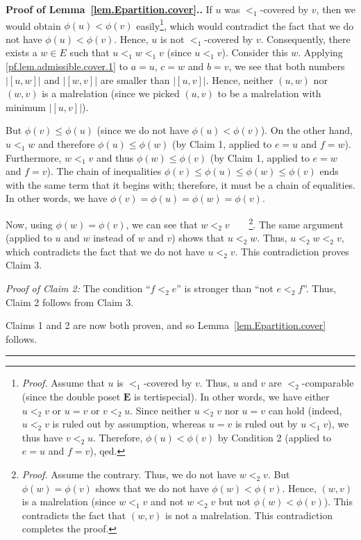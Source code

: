 \documentclass[numbers=enddot,12pt,final,onecolumn,notitlepage,abstracton]{scrartcl}
\theoremstyle{definition}
\newenvironment{proof}[1][Proof]{\noindent\textbf{#1.} }{\ \rule{0.5em}{0.5em}}
\newcommand{\EE}{{\mathbf{E}}}
\begin{document}
\begin{proof}[Proof of Lemma~\ref{lem.Epartition.cover}.]
If $u$ was $<_1$-covered by $v$, then we would obtain
$\phi\left(u\right) < \phi\left(v\right)$
easily\footnote{\textit{Proof.} Assume that $u$ is
$<_1$-covered by $v$. Thus, $u$ and $v$ are $<_2$-comparable
(since the double poset $\EE$ is tertispecial). In other words,
we have either $u <_2 v$ or $u = v$ or $v <_2 u$. Since
neither $u <_2 v$ nor $u = v$ can hold (indeed, $u <_2 v$
is ruled out by assumption, whereas $u = v$ is ruled out by
$u <_1 v$), we thus have $v <_2 u$. Therefore,
$\phi\left(u\right) < \phi\left(v\right)$
by Condition 2 (applied to $e = u$ and $f = v$), qed.}, which
would contradict the fact that we do not have
$\phi\left(u\right) < \phi\left(v\right)$. Hence, $u$ is not
$<_1$-covered by $v$. Consequently, there exists a $w \in E$
such that $u <_1 w <_1 v$ (since $u <_1 v$). Consider this
$w$. Applying \eqref{pf.lem.admissible.cover.1} to $a = u$,
$c = w$ and $b = v$, we see that both numbers
$\left|\left[u, w\right]\right|$ and
$\left|\left[w, v\right]\right|$ are smaller than
$\left|\left[u, v\right]\right|$. Hence, neither
$\left(u, w\right)$ nor $\left(w, v\right)$ is a malrelation
(since we picked $\left(u, v\right)$ to be a malrelation with
minimum $\left|\left[u, v\right]\right|$).

But $\phi\left(v\right) \leq \phi\left(u\right)$ (since we do
not have $\phi\left(u\right) < \phi\left(v\right)$). On the
other hand, $u <_1 w$ and therefore $\phi\left(u\right) \leq
\phi\left(w\right)$ (by Claim 1, applied to $e = u$ and
$f = w$). Furthermore, $w <_1 v$ and
thus $\phi\left(w\right) \leq \phi\left(v\right)$ (by Claim 1,
applied to $e = w$ and $f = v$).
The chain of inequalities
$\phi\left(v\right) \leq \phi\left(u\right)
\leq \phi\left(w\right) \leq \phi\left(v\right)$ ends with
the same term that it begins with; therefore, it must be a chain
of equalities. In other words, we have
$\phi\left(v\right) = \phi\left(u\right)
= \phi\left(w\right) = \phi\left(v\right)$.

Now, using $\phi\left(w\right) = \phi\left(v\right)$, we can
see that $w <_2 v$\ \ \ \ \footnote{\textit{Proof.} Assume
the contrary. Thus, we do not have $w <_2 v$. But
$\phi\left(w\right) = \phi\left(v\right)$ shows that we do not
have $\phi\left(w\right) < \phi\left(v\right)$. Hence,
$\left(w, v\right)$ is a malrelation (since $w <_1 v$ and not
$w <_2 v$ but not $\phi\left(w\right) < \phi\left(v\right)$).
This contradicts the fact that $\left(w, v\right)$ is not
a malrelation. This contradiction completes the proof.}.
The same argument (applied to $u$ and $w$ instead of $w$ and
$v$) shows that $u <_2 w$. Thus, $u <_2 w <_2 v$, which
contradicts the fact that we do not have $u <_2 v$. This
contradiction proves Claim 3.

\textit{Proof of Claim 2:} The condition ``$f <_2 e$'' is stronger
than ``not $e <_2 f$''. Thus, Claim 2 follows from Claim 3.

Claims 1 and 2 are now both proven, and so
Lemma~\ref{lem.Epartition.cover} follows.
\end{proof}
\end{document}
